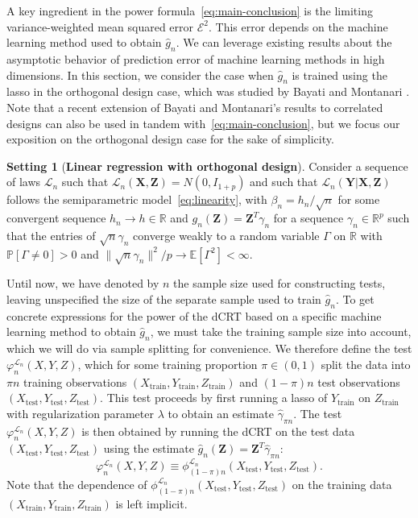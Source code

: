 \documentclass[12pt]{article}
\theoremstyle{definition}
\newtheorem{setting}{Setting}
\theoremstyle{remark}
\newcommand{\prx}{\bm X}
\newcommand{\srx}{X}
\newcommand{\prz}{\bm Z}
\newcommand{\srz}{Z}
\newcommand{\pry}{{\bm Y}}
\newcommand{\sry}{Y}
\begin{document}
A key ingredient in the power formula~\eqref{eq:main-conclusion} is the limiting variance-weighted mean squared error $\mathcal E^2$. This error depends on the machine learning method used to obtain $\widehat g_n$. We can leverage existing results about the asymptotic behavior of prediction error of machine learning methods in high dimensions. In this section, we consider the case when $\widehat g_n$ is trained using the lasso in the orthogonal design case, which was studied by Bayati and Montanari \cite{Bayati2011}. Note that a recent extension of Bayati and Montanari's results to correlated designs \cite{Celentano2020} can also be used in tandem with~\eqref{eq:main-conclusion}, but we focus our exposition on the orthogonal design case for the sake of simplicity.

\begin{setting}[\bf Linear regression with orthogonal design] \label{setting:orthogonal-design}
Consider a sequence of laws $\mathcal L_n$ such that $\mathcal L_n(\prx, \prz) = N(0, I_{1+p})$ and such that $\mathcal L_n(\pry|\prx, \prz)$ follows the semiparametric model~\eqref{eq:linearity},  with $\beta_n = h_n/\sqrt{n}$ for some convergent sequence $h_n \rightarrow h \in \mathbb R$ and $g_n(\prz) = \prz^T \gamma_n$ for a sequence $\gamma_n \in \mathbb R^p$ such that the entries of $\sqrt n \gamma_n$ converge weakly to a random variable $\Gamma$ on $\mathbb R$ with $\mathbb P[\Gamma \neq 0] > 0$ and $\|\sqrt n \gamma_n\|^2/p \rightarrow \mathbb E[\Gamma^2] < \infty$.
\end{setting}

Until now, we have denoted by $n$ the sample size used for constructing tests, leaving unspecified the size of the separate sample used to train $\widehat g_n$. To get concrete expressions for the power of the dCRT based on a specific machine learning method to obtain $\widehat g_n$, we must take the training sample size into account, which we will do via sample splitting for convenience. We therefore define the test $\varphi_n^{\mathcal L_n}(\srx, \sry, \srz)$, which for some training proportion $\pi \in (0,1)$ split the data into $\pi n$ training observations $(\srx_{\text{train}}, \sry_{\text{train}}, \srz_{\text{train}})$ and $(1-\pi)n$ test observations $(\srx_{\text{test}}, \sry_{\text{test}}, \srz_{\text{test}})$. This test proceeds by first running a lasso of $\sry_{\text{train}}$ on $\srz_{\text{train}}$ with regularization parameter $\lambda$ to obtain an estimate $\widehat \gamma_{\pi n}$. The test $\varphi_n^{\mathcal L_n}(\srx, \sry, \srz)$ is then obtained by running the dCRT on the test data $(\srx_{\text{test}}, \sry_{\text{test}}, \srz_{\text{test}})$ using the estimate $\widehat g_n(\prz) = \prz^T \widehat \gamma_{\pi n}$:
\begin{equation*}
	\varphi_n^{\mathcal L_n}(\srx, \sry, \srz) \equiv \phi_{(1-\pi)n}^{\mathcal L_n}(\srx_{\text{test}}, \sry_{\text{test}}, \srz_{\text{test}}).
\end{equation*}
Note that the dependence of $\phi_{(1-\pi)n}^{\mathcal L_n}(\srx_{\text{test}}, \sry_{\text{test}}, \srz_{\text{test}})$ on the training data $(\srx_{\text{train}}, \sry_{\text{train}}, \srz_{\text{train}})$ is left implicit. 
\end{document}
